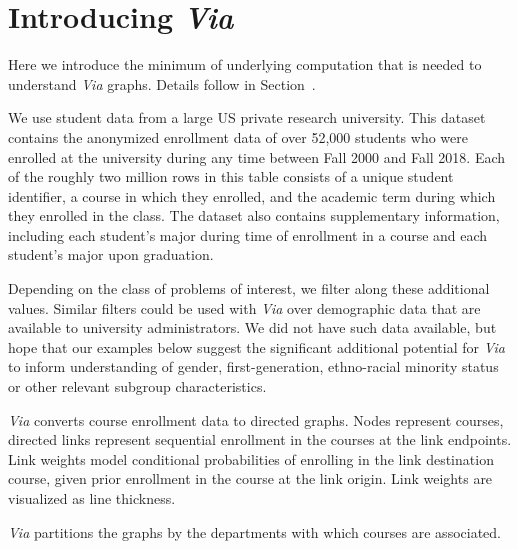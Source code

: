 \section{Introducing \em{Via}}
\label{sec:viaIntro}

Here we introduce the minimum of underlying computation that is needed
to understand {\em Via} graphs. Details follow in
Section~.

We use student data from a large US private research university. This
dataset contains the anonymized enrollment data of over 52,000
students who were enrolled at the university during any time between
Fall 2000 and Fall 2018. Each of the roughly two million rows in this
table consists of a unique student identifier, a course in which they
enrolled, and the academic term during which they enrolled in the
class. The dataset also contains supplementary information, including
each student's major during time of enrollment in a course and each
student's major upon graduation.

Depending on the class of problems of interest, we filter along these
additional values. Similar filters could be used with {\em Via} over
demographic data that are available to university administrators. We
did not have such data available, but hope that our examples below
suggest the significant additional potential for {\em Via} to inform
understanding of gender, first-generation, ethno-racial minority status or other relevant subgroup characteristics.

{\em Via} converts course enrollment data to directed graphs.
Nodes represent courses, directed links represent sequential
enrollment in the courses at the link endpoints. Link weights model
conditional probabilities of enrolling in the link destination course,
given prior enrollment in the course at the link origin. Link weights
are visualized as line thickness.

{\em Via} partitions the graphs by the departments with which courses
are associated. 

